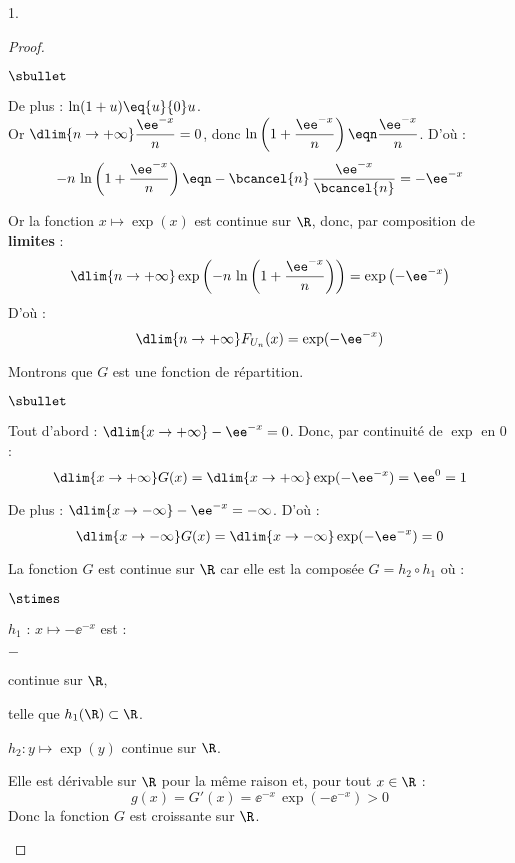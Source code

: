 \begin{noliste}{1.}
\begin{proof}
\begin{noliste}{$\sbullet$}
\item De plus : $\ln(1+u) \eq{u}{0} u$.\\[.1cm]
  Or $\dlim{n\to+\infty} \dfrac{\ee^{-x}}{n}=0$, donc
  $\ln\left(1+\dfrac{\ee^{-x}}{n}\right) \eqn \dfrac{\ee^{-x}}{n}$.
  D'où :
  \[
   -n \, \ln\left(1+\dfrac{\ee^{-x}}{n}\right) \eqn 
   -\bcancel{n} \, \dfrac{\ee^{-x}}{\bcancel{n}}=-\ee^{-x}
  \]
  \item Or la fonction $x\mapsto \exp(x)$ est continue sur $\R$, donc, 
  par composition de {\bf limites} :
  \[
   \dlim{n\to+\infty} \exp\left(-n \, \ln\left(1+ 
   \dfrac{\ee^{-x}}{n}\right)\right) = \exp\left(-\ee^{-x}\right)
  \]
  D'où :
  \[
   \dlim{n\to+\infty} F_{U_n}(x) = \exp(-\ee^{-x})
  \]
\end{noliste}
Montrons que $G$ est une fonction de répartition.
\begin{noliste}{$\sbullet$}
    \item Tout d'abord : $\dlim{x\to+\infty} -\ee^{-x} = 0$. Donc,
    par continuité de $\exp$ en $0$ : 
    \[
     \dlim{x\to+\infty} G(x)= \dlim{x\to+\infty} \exp(-\ee^{-x})=\ee^0=1
    \]
    
    \item De plus : $\dlim{x\to-\infty} -\ee^{-x}=-\infty$. D'où :
    \[
     \dlim{x\to-\infty} G(x)=\dlim{x\to-\infty} \exp(-\ee^{-x}) =0
    \]
    
  \item La fonction $G$ est continue sur $\R$ car elle est la composée
    $G = h_2\circ h_1$ où :
    \begin{noliste}{$\stimes$}
    \item $h_1$ : $x\mapsto -\ee^{-x}$ est :
      \begin{noliste}{$-$}
      \item continue sur $\R$,
      \item telle que $h_1(\R) \subset \R$.
      \end{noliste}
      
    \item $h_2:y\mapsto \exp(y)$ continue sur $\R$.
    \end{noliste}
    
    \item Elle est dérivable sur $\R$ pour la même raison et, pour 
    tout $x\in\R$ :
    \[
     g(x)=G'(x)=\ee^{-x} \, \exp(-\ee^{-x}) >0
    \]
    Donc la fonction $G$ est croissante sur $\R$.
  \end{noliste}
  

\end{proof}
\end{noliste}
